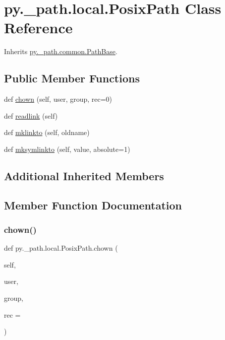 \hypertarget{classpy_1_1__path_1_1local_1_1_posix_path}{}\section{py.\+\_\+path.\+local.\+Posix\+Path Class Reference}
\label{classpy_1_1__path_1_1local_1_1_posix_path}


Inherits \hyperlink{classpy_1_1__path_1_1common_1_1_path_base}{py.\+\_\+path.\+common.\+Path\+Base}.

\subsection*{Public Member Functions}
\begin{DoxyCompactItemize}
\item 
def \hyperlink{classpy_1_1__path_1_1local_1_1_posix_path_ad36c26ff885b3327c728b1f88d791e62}{chown} (self, user, group, rec=0)
\item 
def \hyperlink{classpy_1_1__path_1_1local_1_1_posix_path_a84de60c88bf0a3c2ca992c74bc4688fe}{readlink} (self)
\item 
def \hyperlink{classpy_1_1__path_1_1local_1_1_posix_path_aeeb54221c77afa4cf6e89aa0ec381e0a}{mklinkto} (self, oldname)
\item 
def \hyperlink{classpy_1_1__path_1_1local_1_1_posix_path_ae6498265065f978e73d808d7ecd9ccea}{mksymlinkto} (self, value, absolute=1)
\end{DoxyCompactItemize}
\subsection*{Additional Inherited Members}


\subsection{Member Function Documentation}
\mbox{\label{classpy_1_1__path_1_1local_1_1_posix_path_ad36c26ff885b3327c728b1f88d791e62}} 
\subsubsection{\texorpdfstring{chown()}{chown()}}
{\footnotesize\ttfamily def py.\+\_\+path.\+local.\+Posix\+Path.\+chown (\begin{DoxyParamCaption}\item[{}]{self,  }\item[{}]{user,  }\item[{}]{group,  }\item[{}]{rec = {} }\end{DoxyParamCaption})}

